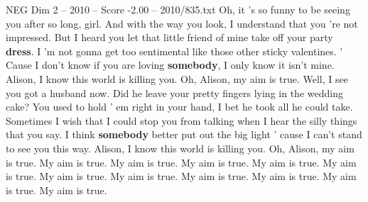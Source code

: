 \begin{textsample}{NEG Dim 2 – 2010 – Score -2.00 – 2010/835.txt}  \label{ex:f2_neg_016}
Oh, it 's so funny to be seeing you after so long, girl.
And with the way you look, I understand that you 're not impressed.
But I heard you let that little friend of mine take off your party \textbf{dress}.
I 'm not gonna get too sentimental like those other sticky valentines. ' Cause I don't know if you are loving \textbf{somebody}, I only know it isn't mine.
Alison, I know this world is killing you.
Oh, Alison, my aim is true.
Well, I see you got a husband now.
Did he leave your pretty fingers lying in the wedding cake?
You used to hold ' em right in your hand, I bet he took all he could take.
Sometimes I wish that I could stop you from talking when I hear the silly things that you say.
I think \textbf{somebody} better put out the big light ' cause I can't stand to see you this way.
Alison, I know this world is killing you.
Oh, Alison, my aim is true.
My aim is true.
My aim is true.
My aim is true.
My aim is true.
My aim is true.
My aim is true.
My aim is true.
My aim is true.
My aim is true.
My aim is true.
My aim is true.

\end{textsample}
